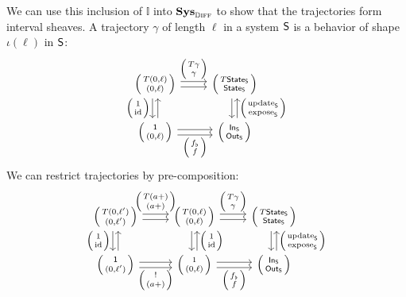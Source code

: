 \documentclass[DynamicalBook]{subfiles}
\begin{document}
  We can use this inclusion of $\mathbb{I}$ into $\textbf{Sys}_{\mathbb{D}\textsc{iff}}$ to show that the trajectories form interval sheaves. A trajectory $\gamma$ of length $\ell$ in a system $\mathsf{S}$ is a behavior of shape $\iota(\ell)$ in $\mathsf{S}$:
  \[
    \begin{tikzcd}
      \lens{T(0, \ell)}{(0, \ell)} \ar[r, shift left, "\littlelens{T\gamma}{\gamma}"] \ar[r, shift right] \ar[d, shift right,
      "\littlelens{1}{\id}"'] \ar[d, shift left, leftarrow] &
      \lens{T\State{S}}{\State{S}} \ar[d, shift left, leftarrow,
      "\littlelens{\update{S}}{\expose{S}}"] \ar[d, shift right]\\
      \lens{\ord{1}}{(0, \ell)} \ar[r, shift left] \ar[r,
      shift right, "\littlelens{f_{{\flat}}}{f}"'] & \lens{\In{S}}{\Out{S}}
    \end{tikzcd}
  \]
We can restrict trajectories by pre-composition:
\[
  \begin{tikzcd}
    \lens{T(0, \ell')}{(0, \ell')} \ar[r, shift left, "\lens{T(a +)}{(a +)}"] \ar[r, shift right] \ar[d, shift right,
    "\lens{1}{\id}"'] \ar[d, shift left, leftarrow] &
    \lens{T(0, \ell)}{(0, \ell)} \ar[r, shift left, "\lens{T\gamma}{\gamma}"] \ar[r, shift right] \ar[d, shift left, leftarrow,
    "\lens{1}{\id}"] \ar[d, shift right] &
    \lens{T\State{S}}{\State{S}}\ar[d, shift left, leftarrow,
    "\lens{\update{S}}{\expose{S}}"] \ar[d, shift right] \\
    \lens{\ord{1}}{(0, \ell')} \ar[r, shift right, "\lens{!}{(a +)}"'] \ar[r,
    shift left] & \lens{1}{(0, \ell)} \ar[r, shift right,
    "\lens{f_{\flat}}{f}"'] \ar[r, shift left]& \lens{\In{S}}{\Out{S}}
  \end{tikzcd}
\]
\end{document}
